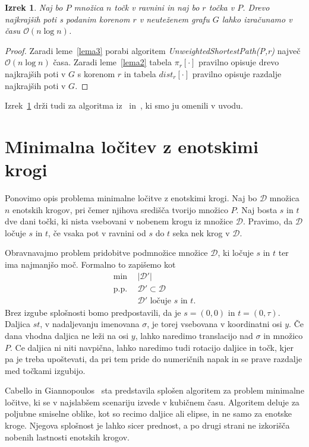 \documentclass[a4paper, 12pt]{book}
\newcommand{\D}{\ensuremath{\mathcal{D}}}
\newcommand{\OO}{\ensuremath{\mathcal{O}}} %
\newtheorem{izrek}{Izrek}[chapter]
\begin{document}
\begin{izrek}
\label{ssspIzrek}
Naj bo $P$ množica $n$ točk v ravnini in naj bo $r$ točka v $P$. Drevo najkrajših poti s podanim korenom $r$ v neuteženem grafu $G$ lahko izračunamo v času $\OO(n\log n)$.
\end{izrek}

\begin{proof}
Zaradi leme~\ref{lema3} porabi algoritem \textit{UnweightedShortestPath(P,r)} naj\-več $\OO(n\log n)$ časa. Zaradi leme~\ref{lema2} tabela $\pi_r[\cdot]$ pravilno opisuje drevo najkrajših poti v $G$ s korenom $r$ in tabela $dist_r[\cdot]$ pravilno opisuje razdalje najkrajših poti v $G$.
\end{proof}
\afterpage{\FloatBarrier}

Izrek~\ref{ssspIzrek} drži tudi za algoritma iz~\cite{ChanS16} in~\cite{eik-01}, ki smo ju omenili v uvodu.

\section{Minimalna ločitev z enotskimi krogi}
Ponovimo opis problema minimalne ločitve z enotskimi krogi.
Naj bo $\D$ množica $n$ enotskih krogov, pri čemer njihova središča tvorijo množico $P$. Naj bosta $s$ in $t$ dve dani točki, ki nista vsebovani v nobenem krogu iz množice $\D$. Pravimo, da $\D$ ločuje $s$ in $t$, če vsaka pot v ravnini od $s$ do $t$ seka nek krog v $\D$.

Obravnavajmo problem pridobitve podmnožice mno\-ži\-ce $\D$, ki ločuje $s$ in $t$ ter ima najmanjšo moč. Formalno to zapišemo kot 
\begin{align*}
	\min ~~		& |\D'|\\
	 \mbox{p.p.}~~ & \D'\subset \D\\
				&	\D'\text{ ločuje $s$ in $t$}. 
\end{align*}
Brez izgube splošnosti bomo predpostavili, da je $s=(0,0)$ in $t=(0,\tau)$. Daljica $st$, v nadaljevanju imenovana $\sigma$, je torej vsebovana v koordinatni osi $y$. Če dana vhodna daljica ne leži na osi $y$, lahko naredimo translacijo nad $\sigma$ in množico $P$. Ce daljica ni niti navpična, lahko naredimo tudi rotacijo daljice in točk, kjer pa je treba upoštevati, da pri tem pride do numeričnih napak in se prave razdalje med točkami izgubijo. 

Cabello in Giannopoulos~\cite{CG16} sta predstavila splošen algoritem za problem minimalne ločitve, ki se v najslabšem scenariju izvede v kubičnem času. Algoritem deluje za poljubne smiselne oblike, kot so recimo daljice ali elipse, in ne samo za enotske kroge. Njegova splošnost je lahko sicer prednost, a po drugi strani ne izkorišča nobenih lastnosti enotskih krogov.
\end{document}
